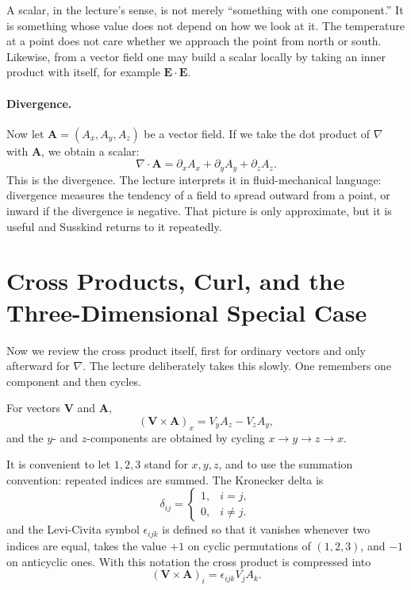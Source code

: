 A scalar, in the lecture's sense, is not merely ``something with one component.'' It is something whose value does not depend on how we look at it. The temperature at a point does not care whether we approach the point from north or south. Likewise, from a vector field one may build a scalar locally by taking an inner product with itself, for example \(\mathbf E\cdot\mathbf E\).

\paragraph{Divergence.}
Now let \(\mathbf A=(A_x,A_y,A_z)\) be a vector field. If we take the dot product of \(\nabla\) with \(\mathbf A\), we obtain a scalar:
\begin{equation}
\nabla\cdot \mathbf A=\partial_x A_x+\partial_y A_y+\partial_z A_z.
\end{equation}
This is the divergence. The lecture interprets it in fluid-mechanical language: divergence measures the tendency of a field to spread outward from a point, or inward if the divergence is negative. That picture is only approximate, but it is useful and Susskind returns to it repeatedly.

\section{Cross Products, Curl, and the Three-Dimensional Special Case}

Now we review the cross product itself, first for ordinary vectors and only afterward for \(\nabla\). The lecture deliberately takes this slowly. One remembers one component and then cycles.

For vectors \(\mathbf V\) and \(\mathbf A\),
\begin{equation}
(\mathbf V\times \mathbf A)_x=V_yA_z-V_zA_y,
\end{equation}
and the \(y\)- and \(z\)-components are obtained by cycling \(x\to y\to z\to x\).

It is convenient to let \(1,2,3\) stand for \(x,y,z\), and to use the summation convention: repeated indices are summed. The Kronecker delta is
\begin{equation}
\delta_{ij}=
\left\{
\begin{array}{ll}
1,& i=j,\\
0,& i\neq j.
\end{array}
\right.
\end{equation}
and the Levi-Civita symbol \(\epsilon_{ijk}\) is defined so that it vanishes whenever two indices are equal, takes the value \(+1\) on cyclic permutations of \((1,2,3)\), and \(-1\) on anticyclic ones. With this notation the cross product is compressed into
\begin{equation}
(\mathbf V\times \mathbf A)_i=\epsilon_{ijk}V_jA_k.
\end{equation}

